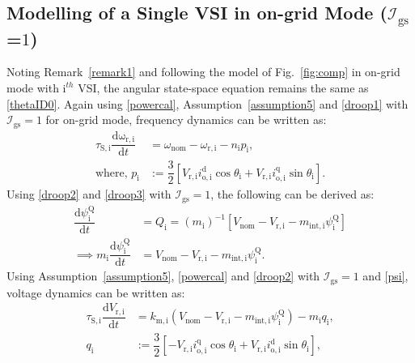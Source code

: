 \documentclass[journal]{IEEEtran}
\begin{document}
\subsection{Modelling of a Single VSI in on-grid Mode ($\mathcal{I}_\mathrm{gs}$=$1$)}
Noting Remark~\ref{remark1} and following the model of Fig.~\ref{fig:comp} in on-grid mode with $\mathrm{i}^{th}$ VSI, the angular state-space equation remains the same as \eqref{thetaID0}.
Again using \eqref{powercal}, Assumption~\ref{assumption5} and \eqref{droop1} with $\mathcal{I}_\mathrm{gs}=1$ for on-grid mode, frequency dynamics can be written as:
\begin{align}
    \tau_\mathrm{S,i}\dfrac{\mathrm{d\omega_\mathrm{r,i}}}{\mathrm{d}t}&=\omega_\mathrm{nom}-\omega_\mathrm{r,i}-n_\mathrm{i}p_\mathrm{i},\label{freqID1a}\\
    \text{where,~}p_\mathrm{i}&:=\dfrac{3}{2}[V_\mathrm{r,i}i_\mathrm{o,i}^\mathrm{d}\cos\theta_\mathrm{i}+V_\mathrm{r,i}i_\mathrm{o,i}^\mathrm{q}\sin\theta_\mathrm{i}].\label{freqID1b}
\end{align}
Using \eqref{droop2} and \eqref{droop3} with $\mathcal{I}_\mathrm{gs}=1$, the following can be derived as:
\begin{align}
    \dfrac{\mathrm{d}\psi^\mathrm{Q}_\mathrm{i}}{\mathrm{d}t}&=Q_\mathrm{i} = (m_\mathrm{i})^{-1}[V_\mathrm{nom}-V_\mathrm{r,i}-m_\mathrm{int,i}\psi^\mathrm{Q}_\mathrm{i}] \nonumber\\
    \implies m_\mathrm{i}\dfrac{\mathrm{d}\psi^\mathrm{Q}_\mathrm{i}}{\mathrm{d}t} &= V_\mathrm{nom}-V_\mathrm{r,i}-m_\mathrm{int,i}\psi^\mathrm{Q}_\mathrm{i}.\label{psi}
\end{align}
Using Assumption~\ref{assumption5}, \eqref{powercal} and \eqref{droop2} with $\mathcal{I}_\mathrm{gs}=1$ and \eqref{psi}, voltage dynamics can be written as:
\begin{align}
    \tau_\mathrm{S,i}\dfrac{\mathrm{d}V_\mathrm{r,i}}{\mathrm{d}t}&=k_\mathrm{m,i}(V_\mathrm{nom}-V_\mathrm{r,i}-m_\mathrm{int,i}\psi^\mathrm{Q}_\mathrm{i})-m_\mathrm{i}q_\mathrm{i},\label{voltID1a}\\
    q_\mathrm{i}&:=\dfrac{3}{2}[-V_\mathrm{r,i}i_\mathrm{o,i}^\mathrm{q}\cos\theta_\mathrm{i}+V_\mathrm{r,i}i_\mathrm{o,i}^\mathrm{d}\sin\theta_\mathrm{i}],\label{voltID1b}
\end{align}
\end{document}
